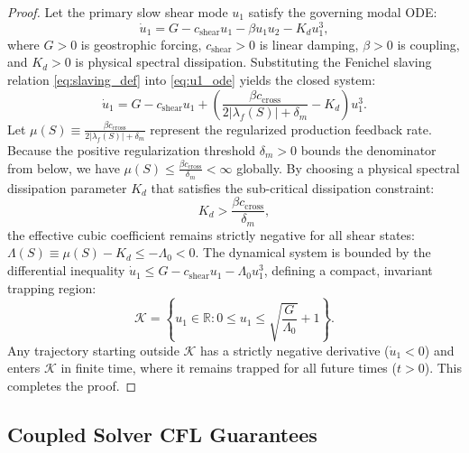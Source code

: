 \begin{proof}
Let the primary slow shear mode $u_1$ satisfy the governing modal ODE:
\begin{equation}
    \dot{u}_1 = G - c_{\text{shear}} u_1 - \beta u_1 u_2 - K_d u_1^3, \label{eq:u1_ode}
\end{equation}
where $G > 0$ is geostrophic forcing, $c_{\text{shear}} > 0$ is linear damping, $\beta > 0$ is coupling, and $K_d > 0$ is physical spectral dissipation. Substituting the Fenichel slaving relation \eqref{eq:slaving_def} into \eqref{eq:u1_ode} yields the closed system:
\begin{equation}
    \dot{u}_1 = G - c_{\text{shear}} u_1 + \left( \frac{\beta c_{\text{cross}}}{2 \left| \lambda_f(S) \right| + \delta_m} - K_d \right) u_1^3. \label{eq:u1_closed}
\end{equation}
Let $\mu(S) \equiv \frac{\beta c_{\text{cross}}}{2 \left| \lambda_f(S) \right| + \delta_m}$ represent the regularized production feedback rate. Because the positive regularization threshold $\delta_m > 0$ bounds the denominator from below, we have $\mu(S) \le \frac{\beta c_{\text{cross}}}{\delta_m} < \infty$ globally. By choosing a physical spectral dissipation parameter $K_d$ that satisfies the sub-critical dissipation constraint:
\begin{equation}
    K_d > \frac{\beta c_{\text{cross}}}{\delta_m}, \label{eq:dissipation_constraint}
\end{equation}
the effective cubic coefficient remains strictly negative for all shear states: $\Lambda(S) \equiv \mu(S) - K_d \le -\Lambda_0 < 0$. The dynamical system is bounded by the differential inequality $\dot{u}_1 \le G - c_{\text{shear}} u_1 - \Lambda_0 u_1^3$, defining a compact, invariant trapping region:
\begin{equation}
    \mathcal{K} = \left\{ u_1 \in \mathbb{R} : 0 \le u_1 \le \sqrt{\frac{G}{\Lambda_0}} + 1 \right\}. \label{eq:trapping_region}
\end{equation}
Any trajectory starting outside $\mathcal{K}$ has a strictly negative derivative ($\dot{u}_1 < 0$) and enters $\mathcal{K}$ in finite time, where it remains trapped for all future times ($t > 0$). This completes the proof.
\end{proof}

\subsection{Coupled Solver CFL Guarantees}

